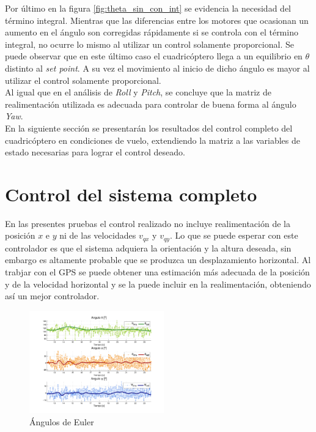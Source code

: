 \documentclass[main]{subfiles}
\begin{document}
Por último en la figura \ref{fig:theta_sin_con_int} se evidencia la necesidad del término integral. Mientras que las diferencias entre los motores que ocasionan un aumento en el ángulo son corregidas rápidamente si se controla con el término integral, no ocurre lo mismo al utilizar un control solamente proporcional. Se puede observar que en este último caso el cuadricóptero llega a un equilibrio en $\theta$ distinto al \emph{set point}. A su vez el movimiento al inicio de dicho ángulo es mayor al utilizar el control solamente proporcional.\\

Al igual que en el análisis de \emph{Roll} y \emph{Pitch}, se concluye que la matriz de realimentación utilizada es adecuada para controlar de buena forma al ángulo \emph{Yaw}. \\

En la siguiente sección se presentarán los resultados del control completo del cuadricóptero en condiciones de vuelo, extendiendo la matriz a las variables de estado necesarias para lograr el control deseado.

\section{Control del sistema completo}
En las presentes pruebas el control realizado no incluye realimentaci\'on de la posici\'on $x$ e $y$ ni de las velocidades $v_{qx}$ y $v_{qy}$. Lo que se puede esperar con este controlador es que el sistema adquiera la orientaci\'on y la altura deseada, sin embargo es altamente probable que se produzca un desplazamiento horizontal. Al trabjar con el GPS se puede obtener una estimaci\'on m\'as adecuada de la posici\'on y de la velocidad horizontal y se la puede incluir en la realimentaci\'on, obteniendo as\'i un mejor controlador.\\

\begin{figure}
	\centering
	\vspace{-20pt}
	\includegraphics[width=0.52\textwidth]{./pics_test_control/euler.pdf}
	\caption{Ángulos de Euler}
	\label{fig:euler}
\end{figure}
\end{document}
